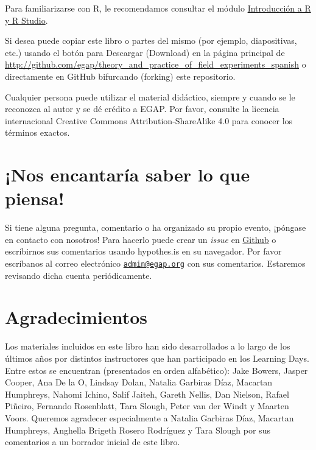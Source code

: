 \documentclass[12pt,spanish,]{book}
\begin{document}
Para familiarizarse con R, le recomendamos consultar el módulo \href{introducción-a-r-y-rstudio.html}{Introducción a R y R Studio}.

Si desea puede copiar este libro o partes del mismo (por ejemplo, diapositivas, etc.) usando el botón para Descargar (Download) en la página principal de \url{http://github.com/egap/theory_and_practice_of_field_experiments_spanish} o directamente en GitHub bifurcando (forking) este repositorio.

Cualquier persona puede utilizar el material didáctico, siempre y cuando se le reconozca al autor y se dé crédito a EGAP. Por favor, consulte la licencia internacional Creative Commons Attribution-ShareAlike 4.0 para conocer los términos exactos.

\hypertarget{nos-encantaruxeda-saber-lo-que-piensa}{%
\section{¡Nos encantaría saber lo que piensa!}\label{nos-encantaruxeda-saber-lo-que-piensa}}

Si tiene alguna pregunta, comentario o ha organizado su propio evento, ¡póngase en contacto con nosotros! Para hacerlo puede crear un \emph{issue} en \href{https://github.com/egap/theory_and_practice_of_field_experiments_spanish/issues}{Github} o escríbirnos sus comentarios usando hypothes.is en su navegador. Por favor escríbanos al correo electrónico \href{mailto:admin@egap.org}{\nolinkurl{admin@egap.org}} con sus comentarios. Estaremos revisando dicha cuenta periódicamente.

\hypertarget{agradecimientos}{%
\section{Agradecimientos}\label{agradecimientos}}

Los materiales incluidos en este libro han sido desarrollados a lo largo de los últimos años por distintos instructores que han participado en los Learning Days. Entre estos se encuentran (presentados en orden alfabético): Jake Bowers, Jasper Cooper, Ana De la O, Lindsay Dolan, Natalia Garbiras Díaz, Macartan Humphreys, Nahomi Ichino, Salif Jaiteh, Gareth Nellis, Dan Nielson, Rafael Piñeiro, Fernando Rosenblatt, Tara Slough, Peter van der Windt y Maarten Voors. Queremos agradecer especialmente a Natalia Garbiras Díaz, Macartan Humphreys, Anghella Brigeth Rosero Rodríguez y Tara Slough por sus comentarios a un borrador inicial de este libro.
\end{document}
